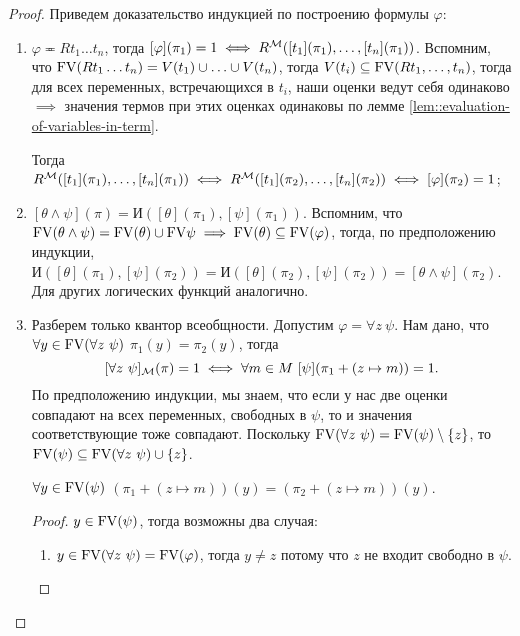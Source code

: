 \begin{proof}
    Приведем доказательство индукцией по построению формулы $\varphi$:
    \begin{enumerate}
        \item $\varphi \eqcirc R t_{1} \ldots t_{n}$, тогда $[\varphi](\pi_{1}) = 1 \iff R^{\mathcal{M}}([t_{1}](\pi_{1}), \ldots, [t_{n}](\pi_{1}))$.
        Вспомним, что $\mathrm{FV}(R t_{1} \ldots t_{n}) = V(t_{1}) \cup \ldots \cup V(t_{n})$, тогда $V(t_{i}) \subseteq \mathrm{FV}(R t_{1}, \ldots, t_{n})$, тогда для всех переменных, встречающихся в $t_{i}$, наши оценки ведут себя одинаково $\implies$ значения термов при этих оценках одинаковы по лемме \ref{lem::evaluation-of-variables-in-term}.
        
        Тогда $R^{\mathcal{M}}([t_{1}](\pi_{1}), \ldots, [t_{n}](\pi_{1})) \iff R^{\mathcal{M}}([t_{1}](\pi_{2}), \ldots, [t_{n}](\pi_{2})) \iff [\varphi](\pi_{2}) = 1$;
        \item $[\theta \land \psi](\pi) = \text{И}([\theta](\pi_{1}), [\psi](\pi_{1}))$.
        Вспомним, что $\mathrm{FV}(\theta \land \psi) = \mathrm{FV}(\theta) \cup \mathrm{FV}{\psi} \implies \mathrm{FV}(\theta) \subseteq \mathrm{FV}(\varphi)$, тогда, по предположению индукции, $\text{И}([\theta](\pi_{1}), [\psi](\pi_{2})) = \text{И}([\theta](\pi_{2}), [\psi](\pi_{2})) = [\theta \land \psi](\pi_{2})$.
        Для других логических функций аналогично.
        \item Разберем только квантор всеобщности.
        Допустим $\varphi = \forall z~ \psi$.
        Нам дано, что $\forall y \in \mathrm{FV}(\forall z~ \psi)$ $\pi_{1}(y) = \pi_{2}(y)$, тогда
        $$
            [\forall z~ \psi]_{\mathcal{M}}(\pi) = 1 \iff \forall m \in M~ [\psi](\pi_{1} + (z \mapsto m)) = 1.
        $$
        По предположению индукции, мы знаем, что если у нас две оценки совпадают на всех переменных, свободных в $\psi$, то и значения соответствующие тоже совпадают.
        Поскольку $\mathrm{FV}(\forall z~\psi) = \mathrm{FV}(\psi) \setminus \{z\}$, то $\mathrm{FV}(\psi) \subseteq \mathrm{FV}(\forall z~ \psi) \cup \{z\}$.
        \begin{statement}
            $\forall y \in \mathrm{FV}(\psi)$ $(\pi_{1} + (z \mapsto m))(y) = (\pi_{2} + (z \mapsto m))(y)$.
        \end{statement}
        \begin{proof}
            $y \in \mathrm{FV}(\psi)$, тогда возможны два случая:
            \begin{enumerate}
                \item $y \in \mathrm{FV}(\forall z~\psi) = \mathrm{FV}(\varphi)$, тогда $y \neq z$ потому что $z$ не входит свободно в $\psi$.

\end{enumerate}
\end{proof}
\end{enumerate}
\end{proof}
